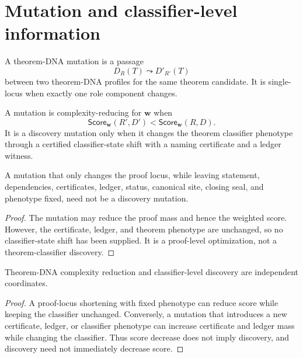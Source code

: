 \section{Mutation and classifier-level information}
\label{sec:theorem-dna-mutation}

\begin{definition}
\label{def:theorem-dna-mutation}
A theorem-DNA mutation is a passage
$$
D_R(T)\leadsto D'_{R'}(T)
$$
between two theorem-DNA profiles for the same theorem candidate. It is
single-locus when exactly one role component changes.
\end{definition}

\begin{definition}
\label{def:theorem-dna-mutation-types}
A mutation is complexity-reducing for $\mathbf w$ when
$$
\mathsf{Score}_{\mathbf w}(R',D')<
\mathsf{Score}_{\mathbf w}(R,D).
$$
It is a discovery mutation only when it changes the theorem classifier
phenotype through a certified classifier-state shift with a naming certificate
and a ledger witness.
\end{definition}

\begin{theorem}
\label{thm:proof-shortening-need-not-be-discovery}
A mutation that only changes the proof locus, while leaving statement,
dependencies, certificates, ledger, status, canonical site, closing seal, and
phenotype fixed, need not be a discovery mutation.
\end{theorem}
\begin{proof}
The mutation may reduce the proof mass and hence the weighted score. However,
the certificate, ledger, and theorem phenotype are unchanged, so no
classifier-state shift has been supplied. It is a proof-level optimization,
not a theorem-classifier discovery.
\end{proof}

\begin{theorem}
\label{thm:complexity-reduction-classifier-discovery-independent}
Theorem-DNA complexity reduction and classifier-level discovery are independent
coordinates.
\end{theorem}
\begin{proof}
A proof-locus shortening with fixed phenotype can reduce score while keeping
the classifier unchanged. Conversely, a mutation that introduces a new
certificate, ledger, or classifier phenotype can increase certificate and
ledger mass while changing the classifier. Thus score decrease does not imply
discovery, and discovery need not immediately decrease score.
\end{proof}

